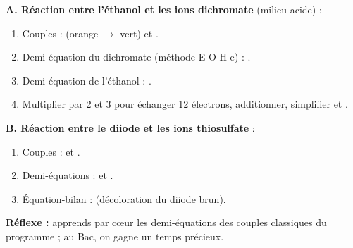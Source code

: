 \documentclass[11pt]{article}
\begin{document}
\begin{methode}
\textbf{A. Réaction entre l'éthanol et les ions dichromate } (milieu acide) :
\begin{enumerate}
\item Couples :  (orange $\to$ vert) et .
\item Demi-équation du dichromate (méthode E-O-H-e) : .
\item Demi-équation de l'éthanol : .
\item Multiplier par 2 et 3 pour échanger 12 électrons, additionner, simplifier  et .
\end{enumerate}
\textbf{B. Réaction entre le diiode et les ions thiosulfate } :
\begin{enumerate}
\item Couples :  et .
\item Demi-équations :  et .
\item Équation-bilan :  (décoloration du diiode brun).
\end{enumerate}
\textbf{Réflexe :} apprends par cœur les demi-équations des couples \og classiques \fg du programme ; au Bac, on gagne un temps précieux.
\end{methode}
\end{document}
